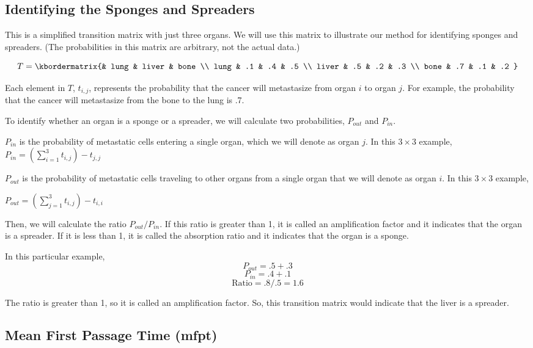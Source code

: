 \documentclass[letterpaper,12pt]{article}
\begin{document}
\subsection{Identifying the Sponges and Spreaders}

This is a simplified transition matrix with just three organs. We will use this matrix to illustrate our method for identifying sponges and spreaders. (The probabilities in this matrix are arbitrary, not the actual data.)

\[
  T=\kbordermatrix{%
      & lung &  liver & bone \\
    lung & .1 & .4 & .5 \\
    liver & .5  & .2 & .3 \\
    bone & .7 & .1 & .2
  } 
\]

Each element in $T$, $t_{i,j}$, represents the probability that the cancer will metastasize from organ $i$ to organ $j$. For example, the probability that the cancer will metastasize from the
bone to the lung is .7. 

To identify whether an organ is a sponge or a spreader, we will calculate two probabilities, $P_{out}$ and $P_{in}$. 

$P_{in}$ is the probability of metastatic cells entering a single organ, which we will denote as organ $j$. In this $3 \times 3$ example, 
$P_{in} = (\sum_{i=1}^{3}t_{i, j}) - t_{j, j}$

$P_{out}$ is the probability of metastatic cells traveling to other organs from a single organ that we will denote as organ $i$. In this $3 \times 3$ example,

$ P_{out} = (\sum_{j=1}^{3}t_{i, j}) - t_{i, i}$

Then, we will calculate the ratio $P_{out}/P_{in}$. If this ratio is greater than 1, it is called an amplification factor 
and it indicates that the organ is a spreader. If it is less than 1, it is called the absorption ratio and it indicates that the organ is a sponge. 

In this particular example,
\[
P_{out} = .5 + .3
\]
\[
P_{in} = .4 + .1
\]
\[
\mbox{Ratio} = .8 / .5 = 1.6
\]

The ratio is greater than 1, so it is called an amplification factor. So, this transition matrix would indicate that the liver is a spreader. 

\subsection{Mean First Passage Time (mfpt)}
\end{document}
